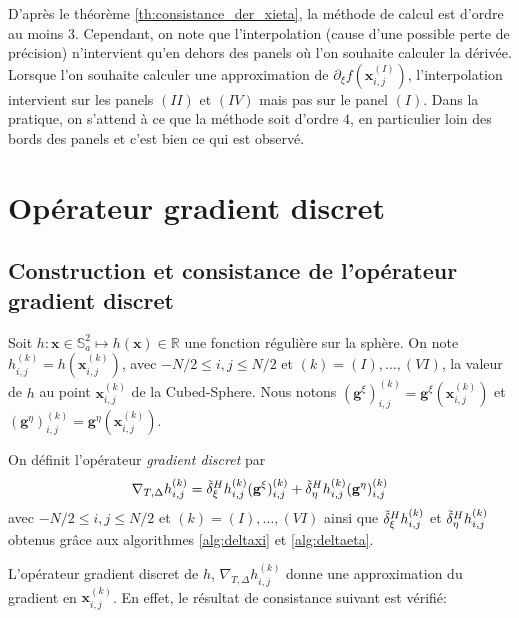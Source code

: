 D'après le théorème \ref{th:consistance_der_xieta}, la méthode de calcul est d'ordre au moins 3. Cependant, on note que l'interpolation (cause d'une possible perte de précision) n'intervient qu'en dehors des panels où l'on souhaite calculer la dérivée.
Lorsque l'on souhaite calculer une approximation de $\partial_{\xi}f(\mathbf{x}_{i,j}^{(I)})$, l'interpolation intervient sur les panels $(II)$ et $(IV)$ mais pas sur le panel $(I)$. Dans la pratique, on s'attend à ce que la méthode soit d'ordre $4$, en particulier loin des bords des panels et c'est bien ce qui est observé.

















\section{Opérateur gradient discret}


\subsection{Construction et consistance de l'opérateur gradient discret}

Soit $h : \mathbf{x} \in \mathbb{S}_a^2 \mapsto h(\mathbf{x}) \in \mathbb{R}$ une fonction régulière sur la sphère. On note $h_{i,j}^{(k)} = h(\mathbf{x}_{i,j}^{(k)})$, avec $-N/2 \leq i,j \leq N/2$ et $(k) = (I) , \ldots , (VI)$, la valeur de $h$ au point $\mathbf{x}_{i,j}^{(k)}$ de la Cubed-Sphere.
Nous notons $( \mathbf{g}^{\xi} )_{i,j}^{(k)} = \mathbf{g}^{\xi} (\mathbf{x}_{i,j}^{(k)})$ et $( \mathbf{g}^{\eta} )_{i,j}^{(k)} = \mathbf{g}^{\eta} (\mathbf{x}_{i,j}^{(k)})$.

\begin{definition}
On définit l'opérateur \textit{gradient discret} par 
\begin{equation}
\nabla_{T,\Delta} h_{i,j}^{(k)} = \tilde{\delta}^H_{\xi} h_{i,j}^{(k)} ( \mathbf{g}^{\xi} )_{i,j}^{(k)} + \tilde{\delta}^H_{\eta} h_{i,j}^{(k)} ( \mathbf{g}^{\eta} )_{i,j}^{(k)}
\end{equation}
avec $-N/2 \leq i,j \leq N/2$ et $(k) = (I), \ldots , (VI)$ ainsi que $\tilde{\delta}^H_{\xi} h_{i,j}^{(k)}$ et $\tilde{\delta}^H_{\eta} h_{i,j}^{(k)}$ obtenus grâce aux algorithmes \ref{alg:deltaxi} et \ref{alg:deltaeta}.
\label{def:gradient_disc}
\end{definition}
L'opérateur gradient discret de $h$, $\nabla_{T,\Delta} h_{i,j}^{(k)}$ donne une approximation du gradient en $\mathbf{x}_{i,j}^{(k)}$. En effet, le résultat de consistance suivant est vérifié:

